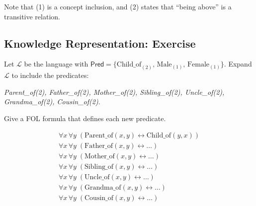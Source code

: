 \documentclass[11pt]{article}
\begin{document}
    Note that (1) is a concept inclusion, and (2) states that ``being above'' is a transitive relation.


    \subsection{Knowledge Representation: Exercise}
    \label{subsec:knowledge-representation:-exercise}

    Let $\mathcal{L}$ be the language with $\mathsf{Pred} = \{\text{Child\_of}_{(2)},\, \text{Male}_{(1)},\, \text{Female}_{(1)}\}$.
    Expand $\mathcal{L}$ to include the predicates:

    \textit{Parent\_of(2), Father\_of(2), Mother\_of(2), Sibling\_of(2), Uncle\_of(2), Grandma\_of(2), Cousin\_of(2)}.

    Give a \ac{FOL} formula that defines each new predicate.

    \[
    \begin{array}{ll}
    \forall x\, \forall y\;(\text{Parent\_of}(x, y) \leftrightarrow \text{Child\_of}(y, x)) \\
    \forall x\, \forall y\;(\text{Father\_of}(x, y) \leftrightarrow \dots )\\
    \forall x\, \forall y\;(\text{Mother\_of}(x, y) \leftrightarrow \dots )\\
    \forall x\, \forall y\;(\text{Sibling\_of}(x, y) \leftrightarrow \dots )\\
    \forall x\, \forall y\;(\text{Uncle\_of}(x, y) \leftrightarrow \dots )\\
    \forall x\, \forall y\;(\text{Grandma\_of}(x, y) \leftrightarrow \dots )\\
    \forall x\, \forall y\;(\text{Cousin\_of}(x, y) \leftrightarrow \dots )\\
    \end{array}
    \]

\end{document}

